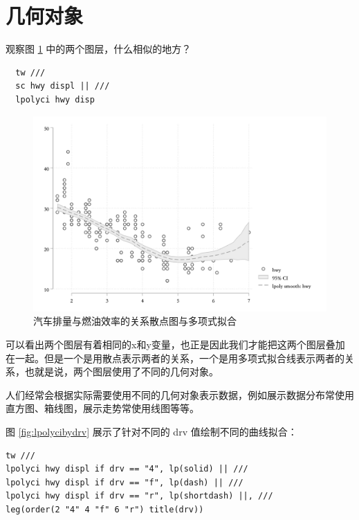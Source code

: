 \section{几何对象}

\begin{problem}
  观察图 \ref{fig:lpolychwydisp} 中的两个图层，什么相似的地方？

  \begin{lstlisting}
  tw ///
  sc hwy displ || ///
  lpolyci hwy disp
  \end{lstlisting}

  \begin{figure}[htbp]
    \centering
    \includegraphics[width=\textwidth]{assets/lpolychwydisp.png}
    \caption{汽车排量与燃油效率的关系散点图与多项式拟合}
    \label{fig:lpolychwydisp}
  \end{figure}
\end{problem}

可以看出两个图层有着相同的x和y变量，也正是因此我们才能把这两个图层叠加在一起。但是一个是用散点表示两者的关系，一个是用多项式拟合线表示两者的关系，也就是说，两个图层使用了不同的几何对象。

人们经常会根据实际需要使用不同的几何对象表示数据，例如展示数据分布常使用直方图、箱线图，展示走势常使用线图等等。

图 \ref{fig:lpolycibydrv} 展示了针对不同的 drv 值绘制不同的曲线拟合：

\begin{lstlisting}
tw ///
lpolyci hwy displ if drv == "4", lp(solid) || ///
lpolyci hwy displ if drv == "f", lp(dash) || ///
lpolyci hwy displ if drv == "r", lp(shortdash) ||, ///
leg(order(2 "4" 4 "f" 6 "r") title(drv))
\end{lstlisting}

